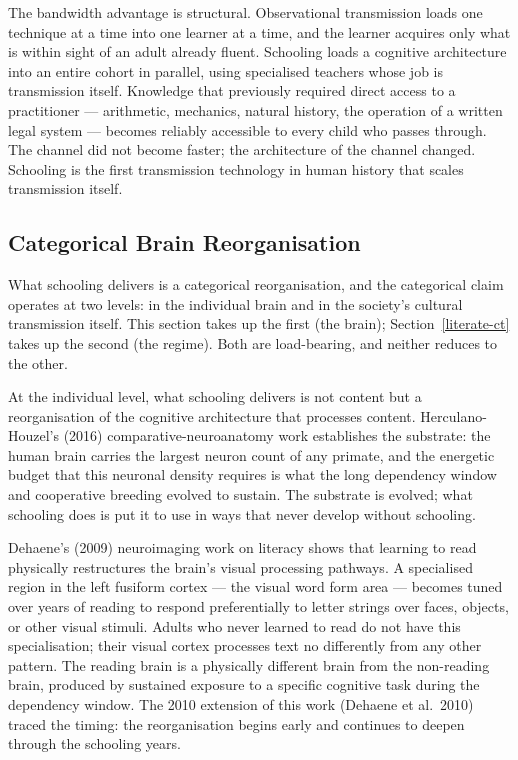 \documentclass[12pt,letterpaper]{article}
\begin{document}
The bandwidth advantage is structural. Observational transmission
loads one technique at a time into one learner at a time, and the
learner acquires only what is within sight of an adult already
fluent. Schooling loads a cognitive architecture into an entire
cohort in parallel, using specialised teachers whose job is
transmission itself. Knowledge that previously required direct access
to a practitioner --- arithmetic, mechanics, natural history, the
operation of a written legal system --- becomes reliably accessible
to every child who passes through. The channel did not become faster;
the architecture of the channel changed. Schooling is the first
transmission technology in human history that scales transmission
itself.

\subsection{Categorical Brain Reorganisation}\label{categorical-brain-reorganisation}

What schooling delivers is a categorical reorganisation, and the
categorical claim operates at two levels: in the individual brain and
in the society's cultural transmission itself. This section takes up
the first (the brain); Section~\ref{literate-ct} takes up the
second (the regime). Both are load-bearing, and neither reduces to
the other.

At the individual level, what schooling delivers is not content but a
reorganisation of the cognitive architecture that processes content.
Herculano-Houzel's (2016) comparative-neuroanatomy work establishes
the substrate: the human brain carries the largest neuron count of
any primate, and the energetic budget that this neuronal density
requires is what the long dependency window and cooperative breeding
evolved to sustain. The substrate is evolved; what schooling does is
put it to use in ways that never develop without schooling.

Dehaene's (2009) neuroimaging work on literacy shows that learning
to read physically restructures the brain's visual processing
pathways. A specialised region in the left fusiform cortex --- the
visual word form area --- becomes tuned over years of reading to
respond preferentially to letter strings over faces, objects, or
other visual stimuli. Adults who never learned to read do not have
this specialisation; their visual cortex processes text no
differently from any other pattern. The reading brain is a physically
different brain from the non-reading brain, produced by sustained
exposure to a specific cognitive task during the dependency window.
The 2010 extension of this work (Dehaene et al.\ 2010) traced the
timing: the reorganisation begins early and continues to deepen
through the schooling years.
\end{document}
